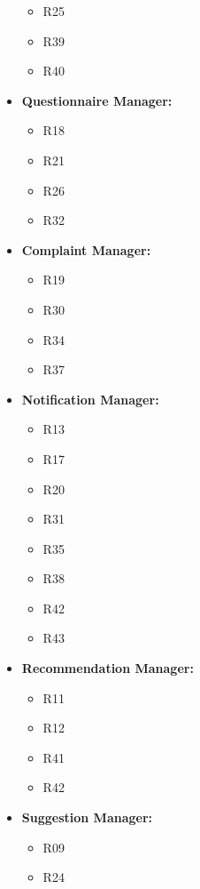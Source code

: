 \begin{itemize}
\begin{itemize}
              \item R25
              \item R39
              \item R40
          \end{itemize}
    \item \textbf{Questionnaire Manager:}
          \begin{itemize}
              \item R18
              \item R21
              \item R26
              \item R32
          \end{itemize}
    \item \textbf{Complaint Manager:}
          \begin{itemize}
              \item R19
              \item R30
              \item R34
              \item R37
          \end{itemize}
    \item \textbf{Notification Manager:}
          \begin{itemize}
              \item R13
              \item R17
              \item R20
              \item R31
              \item R35
              \item R38
              \item R42
              \item R43
          \end{itemize}
    \item \textbf{Recommendation Manager:}
          \begin{itemize}
              \item R11
              \item R12
              \item R41
              \item R42
          \end{itemize}
    \item \textbf{Suggestion Manager:}
          \begin{itemize}
              \item R09
              \item R24

\end{itemize}
\end{itemize}
